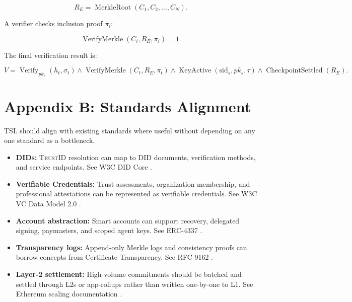 \documentclass[11pt]{article}
\newcommand{\TSL}{\textsc{TSL}}
\newcommand{\TrustID}{\textsc{TrustID}}
\newcommand{\verify}{\operatorname{Verify}}
\newcommand{\MerkleRoot}{\operatorname{MerkleRoot}}
\begin{document}
\begin{equation}
    R_E = \MerkleRoot(C_1, C_2, \ldots, C_N).
\end{equation}

A verifier checks inclusion proof \(\pi_i\):

\begin{equation}
    \operatorname{VerifyMerkle}(C_i, R_E, \pi_i) = 1.
\end{equation}

The final verification result is:

\begin{equation}
V = \verify_{pk_s}(h_t, \sigma_t)
\land \operatorname{VerifyMerkle}(C_t, R_E, \pi_t)
\land \operatorname{KeyActive}(\mathrm{sid}_s, pk_s, \tau)
\land \operatorname{CheckpointSettled}(R_E).
\end{equation}

\section{Appendix B: Standards Alignment}

\TSL{} should align with existing standards where useful without depending on any one standard as a bottleneck.

\begin{itemize}
    \item \textbf{DIDs:} \TrustID{} resolution can map to DID documents, verification methods, and service endpoints. See W3C DID Core \cite{didcore}.
    \item \textbf{Verifiable Credentials:} Trust assessments, organization membership, and professional attestations can be represented as verifiable credentials. See W3C VC Data Model 2.0 \cite{vc2}.
    \item \textbf{Account abstraction:} Smart accounts can support recovery, delegated signing, paymasters, and scoped agent keys. See ERC-4337 \cite{erc4337}.
    \item \textbf{Transparency logs:} Append-only Merkle logs and consistency proofs can borrow concepts from Certificate Transparency. See RFC 9162 \cite{ctv2}.
    \item \textbf{Layer-2 settlement:} High-volume commitments should be batched and settled through L2s or app-rollups rather than written one-by-one to L1. See Ethereum scaling documentation \cite{ethscaling}.
\end{itemize}
\end{document}
